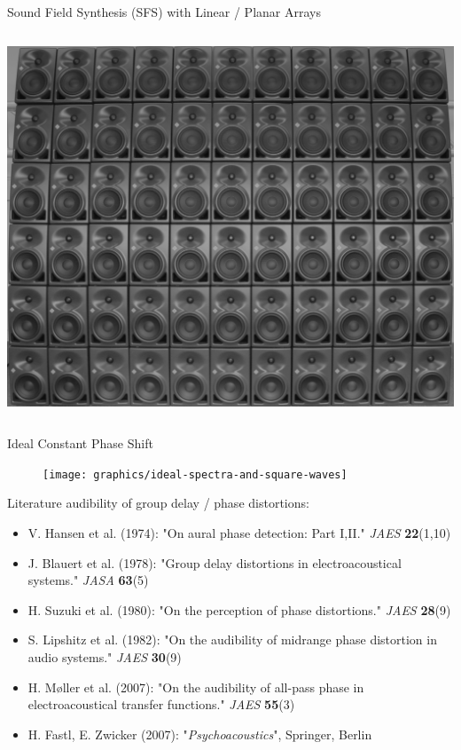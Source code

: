 \documentclass[mathserif]{intbeamer}
\begin{document}
\begin{frame}{Sound Field Synthesis (SFS) with Linear / Planar Arrays}
\begin{columns}[T]
{\includegraphics[width=1\textwidth]{graphics/planararray}
}
\end{columns}
\end{frame}
%
%
%
\begin{frame}{Ideal Constant Phase Shift}
\begin{figure}
\texttt{[image: graphics/ideal-spectra-and-square-waves]}
\end{figure}
%
Literature audibility of group delay / phase distortions:

\begin{itemize}
\setlength\itemsep{-0.1em}
\scriptsize
\item V. Hansen et al. (1974):
"On aural \textcolor{colnonzero}{phase} detection: Part I,II." \textit{JAES} \textbf{22}(1,10)
\item J. Blauert  et al. (1978): "\textcolor{colnonzero}{Group delay distortions}
in electroacoustical systems."
\textit{JASA} \textbf{63}(5)
\item H. Suzuki et al. (1980): "On the perception of
\textcolor{colnonzero}{phase distortions}."
\textit{JAES} \textbf{28}(9)
\item S. Lipshitz et al. (1982): "On the audibility of
\textcolor{colnonzero}{midrange phase distortion} in audio systems."
\textit{JAES} \textbf{30}(9)
\item H. Møller et al. (2007):
"On the audibility of \textcolor{colnonzero}{all-pass phase}
in electroacoustical transfer functions."
\textit{JAES} \textbf{55}(3)
\item H. Fastl, E. Zwicker (2007): "\textit{Psychoacoustics}", Springer, Berlin
\end{itemize}
\end{frame}
%
%
%
\end{document}
